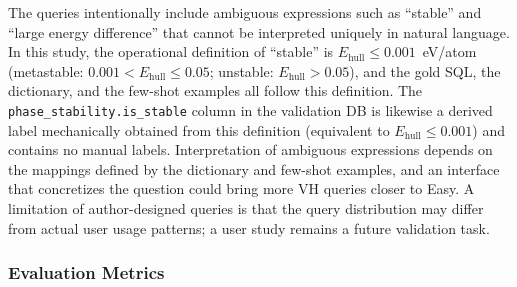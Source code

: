 The queries intentionally include ambiguous expressions such as ``stable'' and ``large energy difference'' that cannot be interpreted uniquely in natural language. In this study, the operational definition of ``stable'' is $E_\text{hull} \leq 0.001$~eV/atom (metastable: $0.001 < E_\text{hull} \leq 0.05$; unstable: $E_\text{hull} > 0.05$), and the gold SQL, the dictionary, and the few-shot examples all follow this definition. The \texttt{phase\_stability.is\_stable} column in the validation DB is likewise a derived label mechanically obtained from this definition (equivalent to $E_\text{hull} \leq 0.001$) and contains no manual labels. Interpretation of ambiguous expressions depends on the mappings defined by the dictionary and few-shot examples, and an interface that concretizes the question could bring more VH queries closer to Easy. A limitation of author-designed queries is that the query distribution may differ from actual user usage patterns; a user study remains a future validation task.


\subsubsection{Evaluation Metrics}

